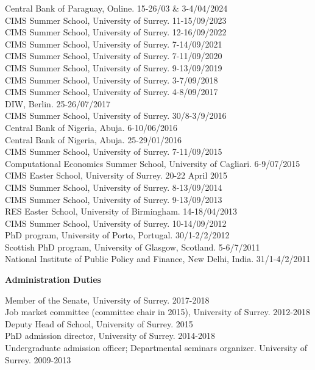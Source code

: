 \documentclass[margin, 11pt]{res} %
\begin{document}
\begin{resume}
Central Bank of Paraguay, Online. \hfill 15-26/03 \& 3-4/04/2024 \\
CIMS Summer School, University of Surrey. \hfill 11-15/09/2023 \\
CIMS Summer School, University of Surrey. \hfill 12-16/09/2022 \\
CIMS Summer School, University of Surrey. \hfill 7-14/09/2021 \\
CIMS Summer School, University of Surrey. \hfill 7-11/09/2020 \\
CIMS Summer School, University of Surrey. \hfill 9-13/09/2019 \\
CIMS Summer School, University of Surrey. \hfill 3-7/09/2018 \\
CIMS Summer School, University of Surrey. \hfill 4-8/09/2017\\
DIW, Berlin. \hfill 25-26/07/2017 \\
CIMS Summer School, University of Surrey. \hfill 30/8-3/9/2016\\
Central Bank of Nigeria, Abuja. \hfill 6-10/06/2016 \\
Central Bank of Nigeria, Abuja. \hfill 25-29/01/2016\\
CIMS Summer School, University of Surrey. \hfill 7-11/09/2015\\
Computational Economics Summer School, University of Cagliari. \hfill 6-9/07/2015\\
CIMS Easter School, University of Surrey. \hfill 20-22 April 2015\\
CIMS Summer School, University of Surrey. \hfill 8-13/09/2014\\
CIMS Summer School, University of Surrey. \hfill 9-13/09/2013\\
RES Easter School, University of Birmingham. \hfill 14-18/04/2013\\
CIMS Summer School, University of Surrey. \hfill 10-14/09/2012 \\
PhD program, University of Porto, Portugal. \hfill 30/1-2/2/2012\\
Scottish PhD program, University of Glasgow, Scotland. \hfill 5-6/7/2011\\
National Institute of Public Policy and Finance, New Delhi, India. \hfill 31/1-4/2/2011


\textbf{Administration Duties}

Member of the Senate, University of Surrey. \hfill 2017-2018\\
Job market committee (committee chair in 2015), University of Surrey. \hfill 2012-2018\\
Deputy Head of School, University of Surrey. \hfill 2015\\
 PhD admission director, University of Surrey. \hfill 2014-2018\\
Undergraduate admission officer; Departmental seminars organizer. University of Surrey. \hfill 2009-2013


\end{resume}
\end{document}
